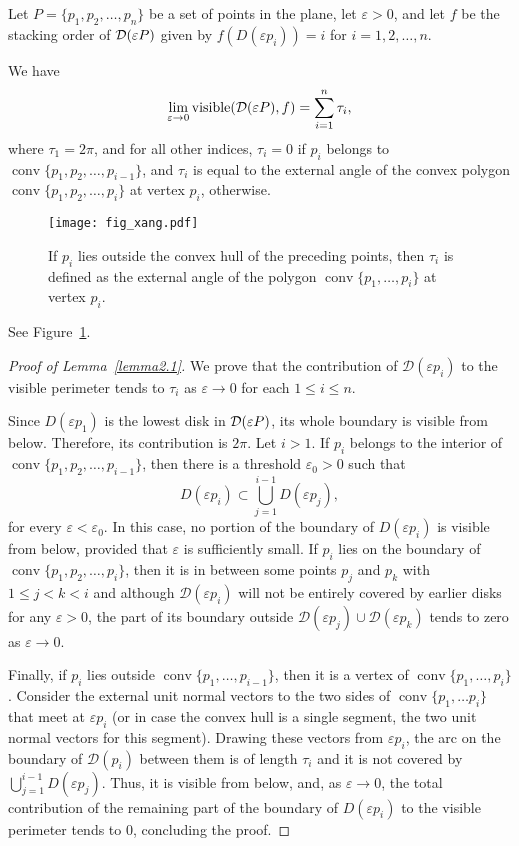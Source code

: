 \documentclass[11pt]{article}
\DeclareMathOperator{\vis}{\mathrm{visible}}
\DeclareMathOperator{\conv}{\mathrm{conv}}
\newcommand{\eps}{\varepsilon}
\begin{document}
\begin{lem}\label{lemma2.1} Let $P=\{p_1, p_2,\ldots, p_n\}$ be a set of
  points in the plane, let $\eps>0$, and let $f$ be the stacking order of ${\cal D}(\eps P)$ given by $f(D(\eps p_i))=i$ for $i=1, 2, \ldots, n$.

We have
$$\lim_{\eps\rightarrow 0}\vis({\cal D}(\eps P),f)=\sum_{i=1}^n \tau_i,$$
where $\tau_1=2\pi$, and for all other indices, $\tau_i=0$ if $p_i$ belongs to $\conv\{p_1,\allowbreak p_2,\allowbreak \ldots,\allowbreak p_{i-1}\}$, and $\tau_i$ is equal to the external angle of the convex polygon $\conv\{p_1, p_2,\ldots, p_i\}$ at vertex $p_i$, otherwise.
\end{lem}

\begin{figure}
\centerline{\texttt{[image: fig\_xang.pdf]}}
\caption{\label{fig_xang}If $p_i$ lies outside the convex hull of the preceding points, then $\tau_i$ is defined as the external angle of the polygon $\conv\{p_1, \ldots, p_i\}$ at vertex $p_i$.}
\end{figure}

See Figure~\ref{fig_xang}.

\begin{proof}[Proof of Lemma~\ref{lemma2.1}] We prove that the contribution of
$\mathcal D(\eps p_i)$ to the visible perimeter tends to $\tau_i$ as
$\eps\to0$ for each $1\le i\le n$.

Since $D(\eps p_1)$ is the lowest disk in ${\cal D}(\eps P)$, its whole
boundary is visible from below. Therefore, its contribution is $2\pi$. Let
$i>1$.
If $p_i$ belongs to the interior of $\conv\{p_1,p_2,\ldots,p_{i-1}\}$, then there is a threshold $\eps_0>0$ such that
$$D(\eps p_i)\subset\bigcup_{j=1}^{i-1}D(\eps p_j),$$
for every $\eps<\eps_0$. In this case, no portion of the boundary of $D(\eps
p_i)$ is visible from below, provided that $\eps$ is sufficiently small. If
$p_i$ lies on the boundary of $\conv\{p_1, p_2,\ldots, p_i\}$, then it is
in between some points $p_j$ and $p_k$ with $1\le j<k<i$ and although $\mathcal
D(\eps p_i)$ will not be entirely covered by earlier disks for any $\eps>0$,
the part of its boundary outside $\mathcal D(\eps p_j)\cup\mathcal D(\eps
p_k)$ tends to zero as $\eps\to 0$.

Finally, if $p_i$ lies outside $\conv\{p_1,\ldots,p_{i-1}\}$, then it is a
vertex of $\conv\{p_1,\allowbreak \ldots,\allowbreak p_i\}$. Consider the external unit normal vectors
to the two sides of $\conv\{p_1,\ldots p_i\}$ that meet at $\eps p_i$ (or in
case the convex hull is a single segment, the two unit normal vectors
for this segment). Drawing these vectors from $\eps p_i$, the arc on the
boundary of $\mathcal D(p_i)$ between them is of length $\tau_i$ and it is not covered by $\bigcup_{j=1}^{i-1}D(\eps p_j)$. Thus, it is visible from below, and, as $\eps\rightarrow 0$, the total contribution of the remaining part of the boundary of $D(\eps p_i)$ to the visible perimeter tends to $0$, concluding the proof.
\end{proof}
\end{document}
